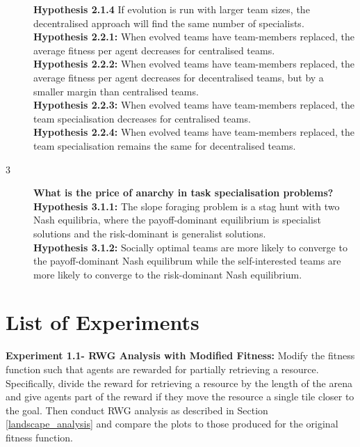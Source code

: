\documentclass[12pt]{article}
\begin{document}
\begin{description}
\textbf{Hypothesis 2.1.4} If evolution is run with larger team sizes, the decentralised approach will find the same number of specialists.\\

\textbf{Hypothesis 2.2.1:} When evolved teams have team-members replaced, the average fitness per agent decreases for centralised teams.\\

\textbf{Hypothesis 2.2.2:} When evolved teams have team-members replaced, the average fitness per agent decreases for decentralised teams, but by a smaller margin than centralised teams.\\

\textbf{Hypothesis 2.2.3:} When evolved teams have team-members replaced, the team specialisation decreases for centralised teams.\\

\textbf{Hypothesis 2.2.4:} When evolved teams have team-members replaced, the team specialisation remains the same for decentralised teams.\\

\item[3] \textbf{What is the price of anarchy in task specialisation problems?}\\

\textbf{Hypothesis 3.1.1:} The slope foraging problem is a stag hunt with two Nash equilibria, where the payoff-dominant equilibrium is specialist solutions and the risk-dominant is generalist solutions.\\

\textbf{Hypothesis 3.1.2:} Socially optimal teams are more likely to converge to the payoff-dominant Nash equilibrum while the self-interested teams are more likely to converge to the risk-dominant Nash equilibrium.\\

\end{description}


\section{List of Experiments}
\textbf{Experiment 1.1- RWG Analysis with Modified Fitness:}  Modify the fitness function such that agents are rewarded for partially retrieving a resource.
Specifically, divide the reward for retrieving a resource by the length of the arena and give agents part of the reward if they move the resource a single tile closer to the goal.
Then conduct RWG analysis as described in Section \ref{landscape_analysis} and compare the plots to those produced for the original fitness function.\\
\end{document}
